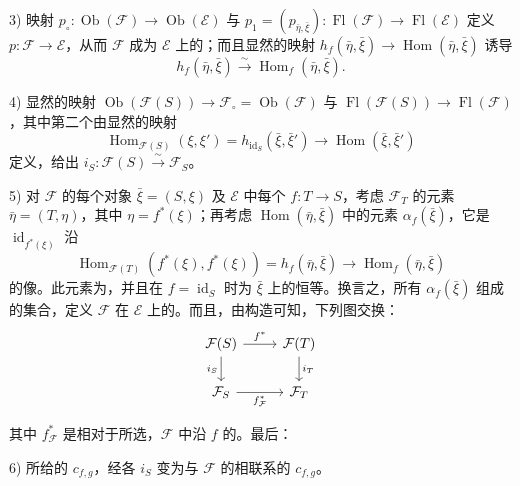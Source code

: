 3) 映射 $p_\circ:\operatorname{Ob}(\mathcal F)\to\operatorname{Ob}(\mathcal E)$ 与 $p_1=(p_{\bar\eta,\bar\xi}):\operatorname{Fl}(\mathcal F)\to\operatorname{Fl}(\mathcal E)$ 定义 $p:\mathcal F\to\mathcal E$，从而 $\mathcal F$ 成为 $\mathcal E$ 上的；而且显然的映射 $h_f(\bar\eta,\bar\xi)\to\operatorname{Hom}(\bar\eta,\bar\xi)$ 诱导
\[
 h_f(\bar\eta,\bar\xi)\xrightarrow{\sim}\operatorname{Hom}_f(\bar\eta,\bar\xi).
\]

4) 显然的映射 $\operatorname{Ob}(\mathcal F(S))\to\mathcal F_\circ=\operatorname{Ob}(\mathcal F)$ 与 $\operatorname{Fl}(\mathcal F(S))\to\operatorname{Fl}(\mathcal F)$，其中第二个由显然的映射
\[
 \operatorname{Hom}_{\mathcal F(S)}(\xi,\xi')=h_{\operatorname{id}_S}(\bar\xi,\bar\xi')
 \longrightarrow\operatorname{Hom}(\bar\xi,\bar\xi')
\]
定义，给出 $i_S:\mathcal F(S)\xrightarrow{\sim}\mathcal F_S$。

5) 对 $\mathcal F$ 的每个对象 $\bar\xi=(S,\xi)$ 及 $\mathcal E$ 中每个 $f:T\to S$，考虑 $\mathcal F_T$ 的元素 $\bar\eta=(T,\eta)$，其中 $\eta=f^*(\xi)$；再考虑 $\operatorname{Hom}(\bar\eta,\bar\xi)$ 中的元素 $\alpha_f(\bar\xi)$，它是 $\operatorname{id}_{f^*(\xi)}$ 沿
\[
 \operatorname{Hom}_{\mathcal F(T)}(f^*(\xi),f^*(\xi))
 =h_f(\bar\eta,\bar\xi)\longrightarrow\operatorname{Hom}_f(\bar\eta,\bar\xi)
\]
的像。此元素为，并且在 $f=\operatorname{id}_S$ 时为 $\bar\xi$ 上的恒等。换言之，所有 $\alpha_f(\bar\xi)$ 组成的集合，定义 $\mathcal F$ 在 $\mathcal E$ 上的。而且，由构造可知，下列图交换：
\[
\begin{tikzcd}
 \mathcal F(S)\arrow[r,"f^*"]\arrow[d,"i_S"']&\mathcal F(T)\arrow[d,"i_T"]\\
 \mathcal F_S\arrow[r,"f^*_{\mathcal F}"']&\mathcal F_T
\end{tikzcd}
\]

其中 $f^*_{\mathcal F}$ 是相对于所选，$\mathcal F$ 中沿 $f$ 的。最后：

6) 所给的 $c_{f,g}$，经各 $i_S$ 变为与 $\mathcal F$ 的相联系的 $c_{f,g}$。

